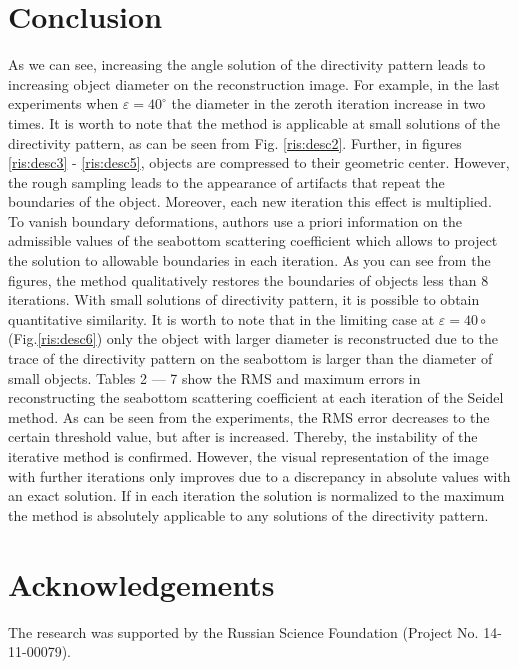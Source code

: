 \documentclass{procDDs}
\begin{document}
\section*{Conclusion}
As we can see, increasing the angle solution of the directivity pattern leads to increasing object diameter on the reconstruction image. For example, in the last experiments when $\varepsilon=40^\circ$ the diameter in the zeroth iteration increase in two times. It is worth to note that the method is applicable at small solutions of the directivity pattern, as can be seen from Fig. \ref{ris:desc2}. Further, in figures \ref{ris:desc3} - \ref{ris:desc5}, objects are compressed to their geometric center. However, the rough sampling leads to the appearance of artifacts that repeat the boundaries of the object. Moreover, each new iteration this effect is multiplied. To vanish boundary deformations, authors use a priori information on the admissible values of the seabottom scattering coefficient which allows to project the solution to allowable boundaries in each iteration. As you can see from the figures, the method qualitatively restores the boundaries of objects less than 8 iterations. With small solutions of directivity pattern, it is possible to obtain quantitative similarity. It is worth to note that in the limiting case at $\varepsilon = 40\circ$ (Fig.\ref{ris:desc6}) only the object with larger diameter is reconstructed due to the trace of the directivity pattern on the seabottom is larger than the diameter of small objects. Tables 2 --- 7 show the RMS and maximum errors in reconstructing the seabottom scattering coefficient at each iteration of the Seidel method. As can be seen from the experiments, the RMS error decreases to the certain threshold value, but after is increased. Thereby, the instability of the iterative method is confirmed. However, the visual representation of the image with further iterations only improves due to a discrepancy in absolute values with an exact solution. If in each iteration the solution is normalized to the maximum the method is absolutely applicable to any solutions of the directivity pattern.

\section*{Acknowledgements}
The research was supported by the Russian Science Foundation (Project No. 14-11-00079).

\end{document}

